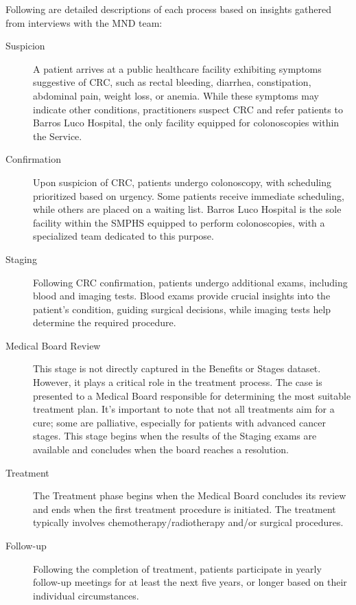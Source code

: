 Following are detailed descriptions of each process based on insights gathered from interviews with the MND team:

\begin{description}
   \item[Suspicion] A patient arrives at a public healthcare facility exhibiting symptoms suggestive of CRC, such as rectal bleeding, diarrhea, constipation, abdominal pain, weight loss, or anemia. While these symptoms may indicate other conditions, practitioners suspect CRC and refer patients to Barros Luco Hospital, the only facility equipped for colonoscopies within the Service.
   
   \item[Confirmation] Upon suspicion of CRC, patients undergo colonoscopy, with scheduling prioritized based on urgency. Some patients receive immediate scheduling, while others are placed on a waiting list. Barros Luco Hospital is the sole facility within the SMPHS equipped to perform colonoscopies, with a specialized team dedicated to this purpose.
   
   \item[Staging] Following CRC confirmation, patients undergo additional exams, including blood and imaging tests. Blood exams provide crucial insights into the patient's condition, guiding surgical decisions, while imaging tests help determine the required procedure.
   
   \item[Medical Board Review] This stage is not directly captured in the Benefits or Stages dataset. However, it plays a critical role in the treatment process. The case is presented to a Medical Board responsible for determining the most suitable treatment plan. It's important to note that not all treatments aim for a cure; some are palliative, especially for patients with advanced cancer stages. This stage begins when the results of the Staging exams are available and concludes when the board reaches a resolution.
   
   \item[Treatment] The Treatment phase begins when the Medical Board concludes its review and ends when the first treatment procedure is initiated. The treatment typically involves chemotherapy/radiotherapy and/or surgical procedures.
   
   \item[Follow-up] Following the completion of treatment, patients participate in yearly follow-up meetings for at least the next five years, or longer based on their individual circumstances.
\end{description}

